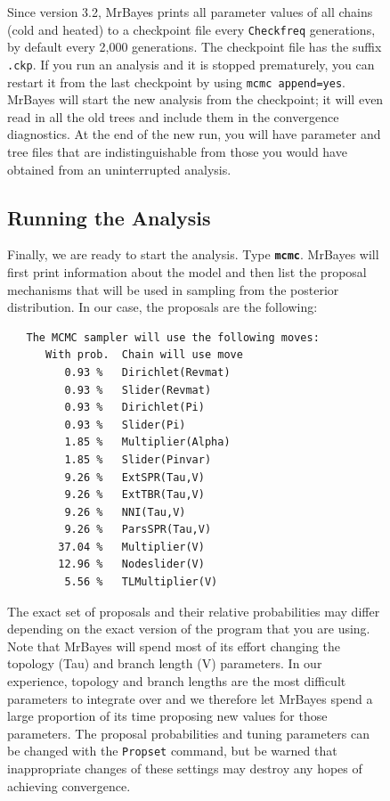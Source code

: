 \documentclass[12pt]{book}
\newcommand{\ttt}[1]{\texttt{#1}}
\newcommand{\tb}[1]{\ttt{\textbf{#1}}}
\begin{document}
\begin{figure}[h]
Since version 3.2, MrBayes prints all parameter values of all chains (cold and heated) to a
checkpoint file every \ttt{Checkfreq} generations, by default every 2,000 generations. The
checkpoint file has the suffix \ttt{.ckp}. If you run an analysis and it is stopped prematurely,
you can restart it from the last checkpoint by using \ttt{mcmc append=yes}. MrBayes will start the
new analysis from the checkpoint; it will even read in all the old trees and include them in the
convergence diagnostics. At the end of the new run, you will have parameter and tree files that are
indistinguishable from those you would have obtained from an uninterrupted analysis.

\subsection{Running the Analysis}

Finally, we are ready to start the analysis. Type \tb{mcmc}. MrBayes will first print information
about the model and then list the proposal mechanisms that will be used in sampling from the
posterior distribution. In our case, the proposals are the following:

\begin{singlespacing}
\footnotesize
\begin{verbatim}
   The MCMC sampler will use the following moves:
      With prob.  Chain will use move
         0.93 %   Dirichlet(Revmat)
         0.93 %   Slider(Revmat)
         0.93 %   Dirichlet(Pi)
         0.93 %   Slider(Pi)
         1.85 %   Multiplier(Alpha)
         1.85 %   Slider(Pinvar)
         9.26 %   ExtSPR(Tau,V)
         9.26 %   ExtTBR(Tau,V)
         9.26 %   NNI(Tau,V)
         9.26 %   ParsSPR(Tau,V)
        37.04 %   Multiplier(V)
        12.96 %   Nodeslider(V)
         5.56 %   TLMultiplier(V)
\end{verbatim}
\normalsize
\end{singlespacing}

The exact set of proposals and their relative probabilities may differ depending on the exact
version of the program that you are using. Note that MrBayes will spend most of its effort changing
the topology (Tau) and branch length (V) parameters. In our experience, topology and branch lengths
are the most difficult parameters to integrate over and we therefore let MrBayes spend a large
proportion of its time proposing new values for those parameters. The proposal probabilities and
tuning parameters can be changed with the \ttt{Propset} command, but be warned that inappropriate
changes of these settings may destroy any hopes of achieving convergence.


\end{figure}
\end{document}
